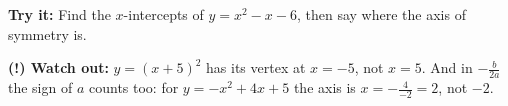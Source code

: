 \documentclass[12pt]{article}
\begin{document}
\begin{tryitbox}
\textbf{Try it:} Find the $x$-intercepts of $y = x^2 - x - 6$, then say where
the axis of symmetry is.\\[2pt]
\end{tryitbox}

\begin{watchoutbox}
\textbf{(!) Watch out:} $y = (x+5)^2$ has its vertex at $x = -5$, not $x = 5$.
And in $-\frac{b}{2a}$ the sign of $a$ counts too: for $y = -x^2 + 4x + 5$ the
axis is $x = -\frac{4}{-2} = 2$, not $-2$.
\end{watchoutbox}
\end{document}
